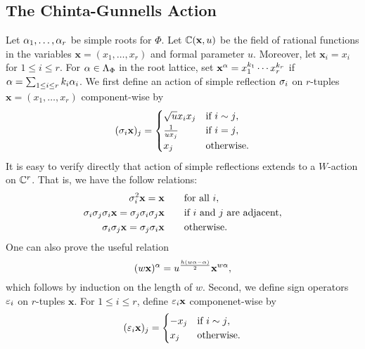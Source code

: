 \documentclass[12pt,reqno,oneside]{amsart}
\begin{document}
    \subsection*{The Chinta-Gunnells Action}
        Let $\alpha_{1},\ldots,\alpha_{r}$ be simple roots for $\Phi$. Let $\mathbb{C}(\mathbf{x},u)$ be the field of rational functions in the variables $\mathbf{x} = (x_{1},\ldots,x_{r})$ and formal parameter $u$. Moreover, let $\mathbf{x}_{i} = x_{i}$ for $1 \le i \le r$. For $\alpha \in \Lambda_{\Phi}$ in the root lattice, set $\mathbf{x}^{\alpha} = x_{1}^{k_{1}} \cdots x_{r}^{k_{r}}$ if $\alpha = \sum_{1 \le i \le r}k_{i}\alpha_{i}$. We first define an action of simple reflection $\sigma_{i}$ on $r$-tuples $\mathbf{x} = (x_{1},\ldots,x_{r})$ component-wise by
        \[
            (\sigma_{i}\mathbf{x})_{j} = \begin{cases} \sqrt{u}x_{i}x_{j} & \text{if $i \sim j$}, \\ \frac{1}{ux_{j}} & \text{if $i = j$}, \\ x_{j} & \text{otherwise}. \end{cases}
        \]
        It is easy to verify directly that action of simple reflections extends to a $W$-action on $\mathbb{C}^{r}$. That is, we have the follow relations:
        \begin{equation}\label{equ:relations_for_action_of_simple_reflections_on_tuples}
            \begin{aligned}
                \sigma_{i}^{2}\mathbf{x} = \mathbf{x} \qquad &\text{for all $i$}, \\
                \sigma_{i}\sigma_{j}\sigma_{i}\mathbf{x} = \sigma_{j}\sigma_{i}\sigma_{j}\mathbf{x} \qquad &\text{if $i$ and $j$ are adjacent}, \\
                \sigma_{i}\sigma_{j}\mathbf{x} = \sigma_{j}\sigma_{i}\mathbf{x} \qquad &\text{otherwise}.
            \end{aligned}
        \end{equation}
        One can also prove the useful relation
        \begin{equation}\label{equ:useful_relation}
            (w\mathbf{x})^{\alpha} = u^{\frac{h(w\alpha-\alpha)}{2}}\mathbf{x}^{w\alpha},
        \end{equation}
        which follows by induction on the length of $w$. Second, we define sign operators $\varepsilon_{i}$ on $r$-tuples $\mathbf{x}$. For $1 \le i \le r$, define $\varepsilon_{i}\mathbf{x}$ componenet-wise by
        \[
            (\varepsilon_{i}\mathbf{x})_{j} = \begin{cases} -x_{j} & \text{if $i \sim j$}, \\ x_{j} & \text{otherwise}. \end{cases}
        \]
\end{document}
